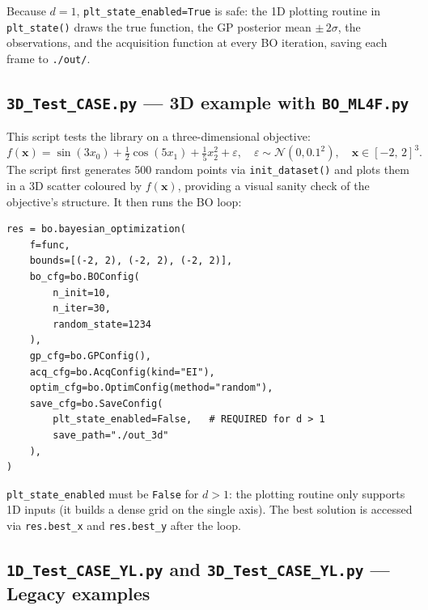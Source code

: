 \documentclass[11pt,a4paper]{article}
\newcommand{\bx}{\bm{x}}
\newcommand{\N}{\mathcal{N}}
\theoremstyle{remark}
\newcommand{\codefile}[1]{\texttt{#1}}
\newcommand{\codefn}[1]{\texttt{#1()}}
\begin{document}
Because $d=1$, \texttt{plt\_state\_enabled=True} is safe: the 1D plotting
routine in \codefn{plt\_state} draws the true function, the GP posterior
mean $\pm\,2\sigma$, the observations, and the acquisition function at every
BO iteration, saving each frame to \texttt{./out/}.

\subsection{\texttt{3D\_Test\_CASE.py} --- 3D example with \codefile{BO\_ML4F.py}}
\label{sec:ex3d}

This script tests the library on a three-dimensional objective:
\begin{equation}
  \label{eq:f3d}
  f(\bx) = \sin(3x_0) + \tfrac{1}{2}\cos(5x_1) + \tfrac{1}{5}x_2^2 + \varepsilon,
  \quad \varepsilon \sim \N(0, 0.1^2),
  \quad \bx \in [-2,\,2]^3.
\end{equation}
The script first generates 500 random points via \codefn{init\_dataset}
and plots them in a 3D scatter coloured by $f(\bx)$, providing a visual
sanity check of the objective's structure.  It then runs the BO loop:

\begin{lstlisting}[numbers=none, caption=\codefile{3D\_Test\_CASE.py} --- key call]
res = bo.bayesian_optimization(
    f=func,
    bounds=[(-2, 2), (-2, 2), (-2, 2)],
    bo_cfg=bo.BOConfig(
        n_init=10,
        n_iter=30,
        random_state=1234
    ),
    gp_cfg=bo.GPConfig(),
    acq_cfg=bo.AcqConfig(kind="EI"),
    optim_cfg=bo.OptimConfig(method="random"),
    save_cfg=bo.SaveConfig(
        plt_state_enabled=False,   # REQUIRED for d > 1
        save_path="./out_3d"
    ),
)
\end{lstlisting}

\texttt{plt\_state\_enabled} must be \texttt{False} for $d>1$: the plotting
routine only supports 1D inputs (it builds a dense grid on the single axis).
The best solution is accessed via \texttt{res.best\_x} and
\texttt{res.best\_y} after the loop.

\subsection{\texttt{1D\_Test\_CASE\_YL.py} and \texttt{3D\_Test\_CASE\_YL.py}
  --- Legacy examples}
\label{sec:exyl}
\end{document}

